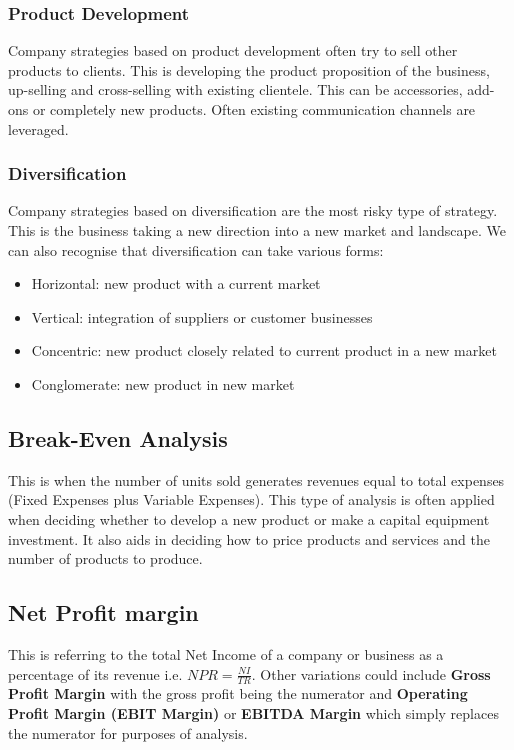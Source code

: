 \documentclass[a4paper]{article}
\begin{document}
{\subsubsection{Product Development}
Company strategies based on product development often try to sell other products to clients. This is developing the product proposition of the business, up-selling and cross-selling with existing clientele. This can be accessories, add-ons or completely new products. Often existing communication channels are leveraged.

\subsubsection{Diversification}
Company strategies based on diversification are the most risky type of strategy. This is the business taking a new direction into a new market and landscape. We can also recognise that diversification can take various forms:
\begin{itemize}
	\item Horizontal: new product with a current market
	\item Vertical: integration of suppliers or customer businesses
	\item Concentric: new product closely related to current product in a new market
	\item Conglomerate: new product in new market
\end{itemize}

\subsection{Break-Even Analysis}
This is when the number of units sold generates revenues equal to total expenses (Fixed Expenses plus Variable Expenses). This type of analysis is often applied when deciding whether to develop a new product or make a capital equipment investment. It also aids in deciding how to price products and services and the number of products to produce.

\subsection{Net Profit margin}
This is referring to the total Net Income of a company or business as a percentage of its revenue i.e. $NPR = \frac{NI}{TR}$. Other variations could include \textbf{Gross Profit Margin} with the gross profit being the numerator and \textbf{Operating Profit Margin (EBIT Margin)} or \textbf{EBITDA Margin} which simply replaces the numerator for purposes of analysis.

}
\end{document}
